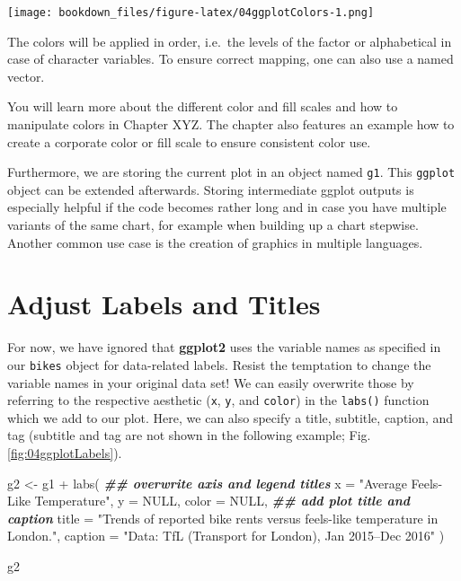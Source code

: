 \documentclass[
]{krantz}
\makeatletter
\newenvironment{Shaded}{\begin{snugshade}}{\end{snugshade}}
\newcommand{\AttributeTok}[1]{\textcolor[rgb]{0.61,0.61,0.61}{#1}}
\newcommand{\ConstantTok}[1]{\textcolor[rgb]{0,0,0}{#1}}
\newcommand{\DocumentationTok}[1]{\textcolor[rgb]{0.37,0.37,0.37}{\textbf{\textit{#1}}}}
\newcommand{\FunctionTok}[1]{\textcolor[rgb]{0,0,0}{#1}}
\newcommand{\NormalTok}[1]{#1}
\newcommand{\OtherTok}[1]{\textcolor[rgb]{0.37,0.37,0.37}{#1}}
\newcommand{\SpecialCharTok}[1]{\textcolor[rgb]{0,0,0}{#1}}
\newcommand{\StringTok}[1]{\textcolor[rgb]{0.5,0.5,0.5}{#1}}
\newenvironment{kframe}{%
\medskip{}
\setlength{\fboxsep}{.8em}
 \def\at@end@of@kframe{}%
 \ifinner\ifhmode%
  \def\at@end@of@kframe{\end{minipage}}%
  \begin{minipage}{\columnwidth}%
 \fi\fi%
 \def\FrameCommand##1{\hskip\@totalleftmargin \hskip-\fboxsep
 \colorbox{shadecolor}{##1}\hskip-\fboxsep
     \hskip-\linewidth \hskip-\@totalleftmargin \hskip\columnwidth}%
 \MakeFramed {\advance\hsize-\width
   \@totalleftmargin\z@ \linewidth\hsize
   \@setminipage}}%
 {\par\unskip\endMakeFramed%
 \at@end@of@kframe}
\renewenvironment{Shaded}{\begin{kframe}}{\end{kframe}}
\makeatother
\begin{document}
\texttt{[image: bookdown\_files/figure-latex/04ggplotColors-1.png]}

The colors will be applied in order, i.e.~the levels of the factor or alphabetical in case of character variables. To ensure correct mapping, one can also use a named vector.

You will learn more about the different color and fill scales and how to manipulate colors in Chapter XYZ. The chapter also features an example how to create a corporate color or fill scale to ensure consistent color use.

Furthermore, we are storing the current plot in an object named \texttt{g1}. This \texttt{ggplot} object can be extended afterwards. Storing intermediate ggplot outputs is especially helpful if the code becomes rather long and in case you have multiple variants of the same chart, for example when building up a chart stepwise. Another common use case is the creation of graphics in multiple languages.

\hypertarget{label-adjustment}{%
\section{Adjust Labels and Titles}\label{label-adjustment}}

For now, we have ignored that \textbf{ggplot2} uses the variable names as specified in our \texttt{bikes} object for data-related labels. Resist the temptation to change the variable names in your original data set! We can easily overwrite those by referring to the respective aesthetic (\texttt{x}, \texttt{y}, and \texttt{color}) in the \texttt{labs()} function which we add to our plot. Here, we can also specify a title, subtitle, caption, and tag (subtitle and tag are not shown in the following example; Fig. \ref{fig:04ggplotLabels}).

\begin{Shaded}
\begin{Highlighting}[]
\NormalTok{g2 }\OtherTok{\textless{}{-}}\NormalTok{ g1 }\SpecialCharTok{+}
  \FunctionTok{labs}\NormalTok{(}
    \DocumentationTok{\#\# overwrite axis and legend titles}
    \AttributeTok{x =} \StringTok{"Average Feels{-}Like Temperature"}\NormalTok{, }\AttributeTok{y =} \ConstantTok{NULL}\NormalTok{, }\AttributeTok{color =} \ConstantTok{NULL}\NormalTok{,}
    \DocumentationTok{\#\# add plot title and caption}
    \AttributeTok{title =} \StringTok{"Trends of reported bike rents versus feels{-}like temperature in London."}\NormalTok{,}
    \AttributeTok{caption =} \StringTok{"Data: TfL (Transport for London), Jan 2015–Dec 2016"}
\NormalTok{  )}

\NormalTok{g2}
\end{Highlighting}
\end{Shaded}
\end{document}
